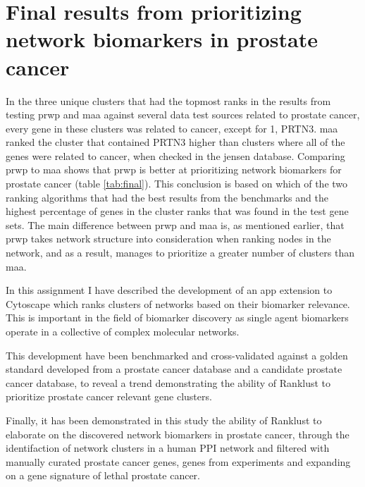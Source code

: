 \section{Final results from prioritizing network biomarkers in prostate cancer}
In the three unique clusters that had the topmost ranks in the results from
testing \gls{prwp} and \gls{maa} against several data test sources related to
prostate cancer, every gene in these clusters was related to cancer, except for
1, PRTN3. \gls{maa} ranked the cluster that contained PRTN3 higher than clusters
where all of the genes were related to cancer, when checked in the \gls{jensen}
database. Comparing \gls{prwp} to \gls{maa} shows that \gls{prwp} is
better at prioritizing network biomarkers for prostate cancer
(table \ref{tab:final}). This conclusion is based on which of the two ranking
algorithms that had the best results from the benchmarks and the highest
percentage of genes in the cluster ranks that was found in the test gene sets.
The main difference between \gls{prwp} and \gls{maa} is, as mentioned earlier,
that \gls{prwp} takes network structure into consideration when ranking nodes in
the network, and as a result, manages to prioritize a greater number of clusters
than \gls{maa}.

In this assignment I have described the development of an app extension to
Cytoscape which ranks clusters of networks based on their biomarker relevance.
This is important in the field of biomarker discovery as single agent biomarkers
operate in a collective of complex molecular networks. 

This development have been benchmarked and cross-validated against a golden
standard developed from a prostate cancer database and a candidate prostate
cancer database, to reveal a trend demonstrating the ability of Ranklust to
prioritize prostate cancer relevant gene clusters.

Finally, it has been demonstrated in this study the ability of Ranklust to
elaborate on the discovered network biomarkers in prostate cancer, through the
identifaction of network clusters in a human PPI network and filtered with
manually curated prostate cancer genes, genes from experiments and expanding on
a gene signature of lethal prostate cancer.
